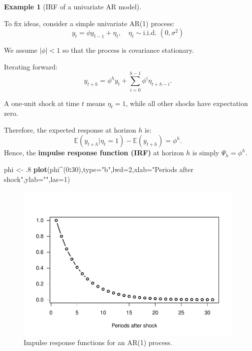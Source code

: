 \documentclass[
  12pt,
]{book}
\newenvironment{Shaded}{\begin{snugshade}}{\end{snugshade}}
\newcommand{\AttributeTok}[1]{\textcolor[rgb]{0.13,0.29,0.53}{#1}}
\newcommand{\DecValTok}[1]{\textcolor[rgb]{0.00,0.00,0.81}{#1}}
\newcommand{\FunctionTok}[1]{\textcolor[rgb]{0.13,0.29,0.53}{\textbf{#1}}}
\newcommand{\NormalTok}[1]{#1}
\newcommand{\OtherTok}[1]{\textcolor[rgb]{0.56,0.35,0.01}{#1}}
\newcommand{\SpecialCharTok}[1]{\textcolor[rgb]{0.81,0.36,0.00}{\textbf{#1}}}
\newcommand{\StringTok}[1]{\textcolor[rgb]{0.31,0.60,0.02}{#1}}
\theoremstyle{definition}
\theoremstyle{definition}
\newtheorem{example}{Example}[chapter]
\theoremstyle{definition}
\theoremstyle{definition}
\theoremstyle{remark}
\begin{document}
\begin{example}[IRF of a univariate AR model]
\protect\hypertarget{exm:IRFsimpleAR}{}\label{exm:IRFsimpleAR}

To fix ideas, consider a simple univariate AR(1) process:
\[
y_t = \phi y_{t-1} + \eta_t, \quad \eta_t \sim \text{i.i.d. } (0,\sigma^2)
\]

We assume \(|\phi| < 1\) so that the process is covariance stationary.

Iterating forward:
\[
y_{t+h} = \phi^h y_t + \sum_{i=0}^{h-1} \phi^i \eta_{t+h-i}.
\]

A one-unit shock at time \(t\) means \(\eta_t = 1\), while all other shocks have expectation zero.

Therefore, the expected response at horizon \(h\) is:
\[
\mathbb{E}(y_{t+h}|\eta_t = 1) - \mathbb{E}(y_{t+h}) = \phi^h.
\]
Hence, the \textbf{impulse response function (IRF)} at horizon \(h\) is simply \(\Psi_h = \phi^h\).

\begin{Shaded}
\begin{Highlighting}[]
\NormalTok{phi }\OtherTok{\textless{}{-}}\NormalTok{ .}\DecValTok{8}
\FunctionTok{plot}\NormalTok{(phi}\SpecialCharTok{\^{}}\NormalTok{(}\DecValTok{0}\SpecialCharTok{:}\DecValTok{30}\NormalTok{),}\AttributeTok{type=}\StringTok{"b"}\NormalTok{,}\AttributeTok{lwd=}\DecValTok{2}\NormalTok{,}\AttributeTok{xlab=}\StringTok{"Periods after shock"}\NormalTok{,}\AttributeTok{ylab=}\StringTok{""}\NormalTok{,}\AttributeTok{las=}\DecValTok{1}\NormalTok{)}
\end{Highlighting}
\end{Shaded}

\begin{figure}
\includegraphics[width=0.9\linewidth]{IdentifStructShocks_files/figure-latex/simAR1-1} \caption{Impulse response functions for an AR(1) process.}\label{fig:simAR1}
\end{figure}

\end{example}
\end{document}
